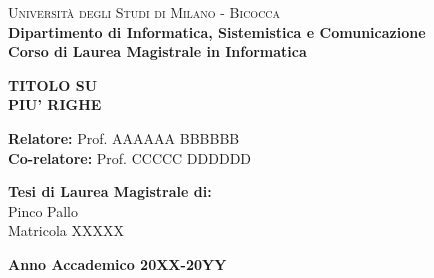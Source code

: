 \documentclass[a4paper,12pt]{report}
\begin{document}
    
    \begin{titlepage}
        
                \noindent
        \begin{minipage}[t]{0.19\textwidth}
        \end{minipage}
        \begin{minipage}[t]{0.81\textwidth}
        {
                {\textsc{Università degli Studi di Milano - Bicocca}} \\
                \textbf{Dipartimento di Informatica, Sistemistica e Comunicazione} \\
                \textbf{Corso di Laurea Magistrale in Informatica} \\
                \par
        }
        \end{minipage}
        
	\vspace{40mm}
        
	\begin{center}
            {\LARGE{
                    \textbf{TITOLO SU\\PIU' RIGHE}
                    \par
            }}
        \end{center}
        
        \vspace{40mm}

        \noindent
        {\large \textbf{Relatore:} Prof. AAAAAA BBBBBB } \\

        \noindent
        {\large \textbf{Co-relatore:} Prof. CCCCC DDDDDD}
        
        \vspace{25mm}

        \begin{flushright}
            {\large \textbf{Tesi di Laurea Magistrale di:}} \\
            \large{Pinco Pallo} \\
            \large{Matricola XXXXX} 
        \end{flushright}
        
        \vspace{30mm}
        \begin{center}
            {\large{\bf Anno Accademico 20XX-20YY}}
        \end{center}

        \restoregeometry
        
    \end{titlepage}
    
\end{document}
